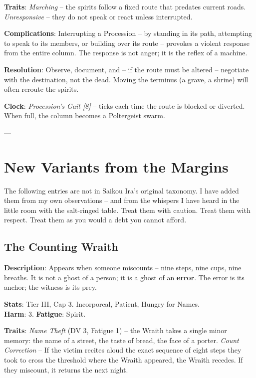\noindent\textbf{Traits}: 
\emph{Marching} -- the spirits follow a fixed route that predates current roads. \emph{Unresponsive} -- they do not speak or react unless interrupted.

\noindent\textbf{Complications}: Interrupting a Procession -- by standing in its path, attempting to speak to its members, or building over its route -- provokes a violent response from the entire column. The response is not anger; it is the reflex of a machine.

\noindent\textbf{Resolution}: Observe, document, and -- if the route must be altered -- negotiate with the destination, not the dead. Moving the terminus (a grave, a shrine) will often reroute the spirits.

\noindent\textbf{Clock}: \emph{Procession's Gait [8]} -- ticks each time the route is blocked or diverted. When full, the column becomes a Poltergeist swarm.


---

\section*{New Variants from the Margins}

The following entries are not in Saikou Ira's original taxonomy. I have added them from my own observations -- and from the whispers I have heard in the little room with the salt-ringed table. Treat them with caution. Treat them with respect. Treat them as you would a debt you cannot afford.

\subsection*{The Counting Wraith}

\noindent\textbf{Description}: Appears when someone miscounts -- nine steps, nine cups, nine breaths. It is not a ghost of a person; it is a ghost of an \textbf{error}. The error is its anchor; the witness is its prey.

\noindent\textbf{Stats}: Tier III, Cap 3. Incorporeal, Patient, Hungry for Names.\\
\textbf{Harm}: 3. \textbf{Fatigue}: Spirit.

\noindent\textbf{Traits}: 
\emph{Name Theft} (DV 3, Fatigue 1) -- the Wraith takes a single minor memory: the name of a street, the taste of bread, the face of a porter. \emph{Count Correction} -- If the victim recites aloud the exact sequence of eight steps they took to cross the threshold where the Wraith appeared, the Wraith recedes. If they miscount, it returns the next night.


